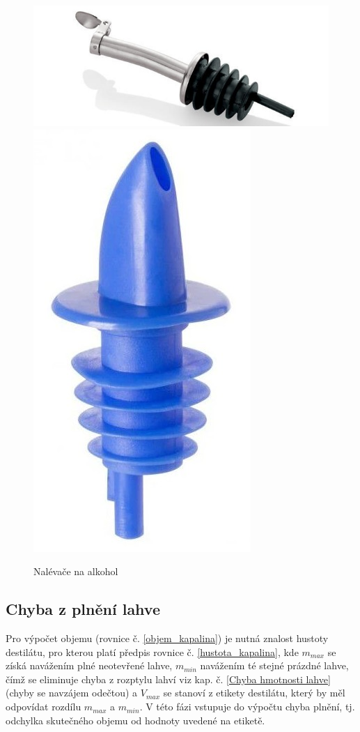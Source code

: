 \begin{figure}[H]
    \begin{center}
        \includegraphics[scale=0.6]{obrazky/nalevac.jpg}
        \includegraphics[scale=0.15]{obrazky/nelévač_plast.jpg}
    \end{center}
    \label{nalevačos}
    \caption{Nalévače na alkohol \cite{nalevatko}}
\end{figure}

\subsection{Chyba z plnění lahve}
\label{Chyby hustoty}
Pro výpočet objemu (rovnice č. \ref{objem_kapalina}) je nutná znalost hustoty destilátu, pro kterou platí předpis rovnice č. \ref{hustota_kapalina}, kde $m_{max}$ se získá navážením plné neotevřené lahve, $m_{min}$ navážením té stejné prázdné lahve, čímž se eliminuje chyba z rozptylu lahví viz kap. č. \ref{Chyba hmotnosti lahve} (chyby se navzájem odečtou) a $V_{max}$ se stanoví z etikety destilátu, který by měl odpovídat rozdílu $m_{max}$ a $m_{min}$. V této fázi vstupuje do výpočtu chyba plnění, tj. odchylka skutečného objemu od hodnoty uvedené na etiketě.


